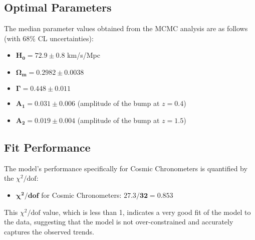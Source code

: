 \documentclass{article}
\begin{document}
\subsection{Optimal Parameters}
The median parameter values obtained from the MCMC analysis are as follows (with 68\% CL uncertainties):
\begin{itemize}
    \item $\mathbf{H_0 = 72.9 \pm 0.8}$ km/s/Mpc
    \item $\mathbf{\Omega_m = 0.2982 \pm 0.0038}$
    \item $\mathbf{\Gamma = 0.448 \pm 0.011}$
    \item $\mathbf{A_1 = 0.031 \pm 0.006}$ (amplitude of the bump at $z=0.4$)
    \item $\mathbf{A_2 = 0.019 \pm 0.004}$ (amplitude of the bump at $z=1.5$)
\end{itemize}

\subsection{Fit Performance}
The model's performance specifically for Cosmic Chronometers is quantified by the $\chi^2/\text{dof}$:
\begin{itemize}
    \item $\mathbf{\chi^2/\text{dof}}$ for Cosmic Chronometers: $\mathbf{27.3/32 = 0.853}$
\end{itemize}
This $\chi^2/\text{dof}$ value, which is less than 1, indicates a very good fit of the model to the data, suggesting that the model is not over-constrained and accurately captures the observed trends.
\end{document}

